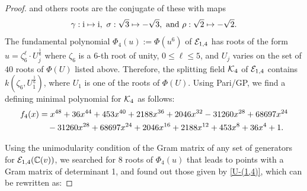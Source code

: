 \documentclass[11pt]{amsart}
\begin{document}
\begin{proof}
	and others roots are the conjugate of these with maps  $$\gamma: {\rm{i}} \mapsto {\rm{i}}, \ \sigma: \sqrt{3}\mapsto -\sqrt{3}, \ \text{and} \ \rho: \sqrt{2}\mapsto -\sqrt{2}.$$ 
%
	The fundamental polynomial $\Phi_4(u):=\Phi(u^6)$ of  ${\mathcal E}_{1, 4}$  has roots of the form 
	$u=\zeta_{6}^\ell \cdot U_j^{\frac{1}{6}}$ where
	$\zeta_6$ is a $6$-th root of unity, $0\leq \ell \leq 5$, and $U_j$ varies on the set of $40$
	roots of $\Phi(U)$ listed above.
		Therefore,  the splitting field ${\mathcal K}_4$ of ${\mathcal E}_{1, 4}$ contains 
	$k(\zeta_6, U_1^{\frac{1}{6}})$, where $U_1$ is one of the roots of $\Phi(U)$.
	Using Pari/GP, \cite[Gp-360]{Shioda360-Codes} we find a defining minimal polynomial for  ${\mathcal K}_4$ as follows:
\begin{align}
f_4(x)	& =x^{48} + 36x^{44} + 453x^{40} + 2188x^{36} + 2046x^{32} - 31260x^{28} + 68697x^{24}\notag \\
	& \quad - 31260x^{28} + 68697x^{24} + 2046x^{16} + 2188x^{12} + 453x^{8} + 36x^{4} + 1. \label{f4}
\end{align}



Using the unimodularity condition  of the  Gram matrix of  any set of generators for  ${\mathcal E}_{1, 4}({\mathbb C}(v))$, we searched for 8 roots of $\Phi_4(u)$ that leads to points with a  Gram matrix of determinant 1, and found out those given by \ref{U-(1,4)}, which can be rewritten as:



\end{proof}
\end{document}
